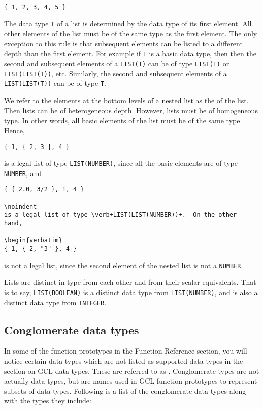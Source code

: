 \begin{verbatim}
{ 1, 2, 3, 4, 5 }
\end{verbatim}

\noindent 
The data type \verb+T+ of a list is determined by the data type of its
first element.  All other elements of the list must be of the same
type as the first element.  The only exception to this rule is that
subsequent elements can be listed to a different depth than the first
element.  For example if \verb+T+ is a basic data type, then then the
second and subsequent elements of a \verb+LIST(T)+ can be of type
\verb+LIST(T)+ or \verb+LIST(LIST(T))+, etc.  Similarly, the second
and subsequent elements of a \verb+LIST(LIST(T))+ can be of type
\verb+T+.  

We refer to the elements at the bottom levels of a nested list as the
 of the list.  Then lists can be of heterogeneous
depth.  However, lists must be of homogeneous type. In other words,
all basic elements of the list must be of the same type.  Hence,

\begin{verbatim}
{ 1, { 2, 3 }, 4 }
\end{verbatim}

\noindent 
is a legal list of type \verb+LIST(NUMBER)+, since all the basic
elements are of type {\tt NUMBER}, and 

\begin{verbatim}
{ { 2.0, 3/2 }, 1, 4 }

\noindent 
is a legal list of type \verb+LIST(LIST(NUMBER))+.  On the other
hand, 

\begin{verbatim}
{ 1, { 2, "3" }, 4 }
\end{verbatim}

\noindent 
is not a legal list, since the second element of the nested list is
not a {\tt NUMBER}.

Lists are distinct in type from each other and from their scalar
equivalents.  That is to say, {\tt LIST(BOOLEAN)} is a distinct data
type from {\tt LIST(NUMBER)}, and is also a distinct data type from
{\tt INTEGER}.
 
\subsection{Conglomerate data types}

In some of the function prototypes in the Function Reference section,
you will notice certain data types which are not listed as supported
data types in the section on GCL data types. These are referred to as
. Conglomerate types are not actually
data types, but are names used in GCL function prototypes to represent
subsets of data types.  Following is a list of the conglomerate data
types along with the types they include:

